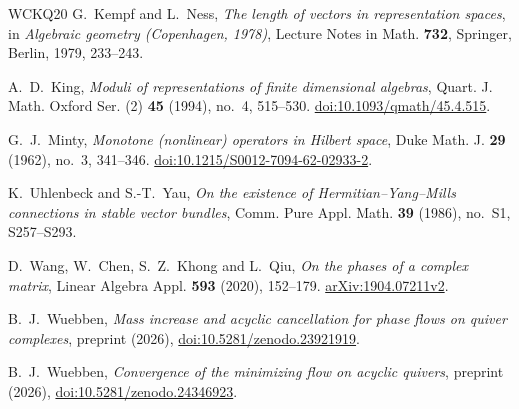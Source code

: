 \begin{thebibliography}{WCKQ20}
G.~Kempf and L.~Ness,
\textit{The length of vectors in representation spaces},
in \textit{Algebraic geometry (Copenhagen, 1978)},
Lecture Notes in Math. \textbf{732}, Springer, Berlin, 1979, 233--243.

A.~D.~King,
\textit{Moduli of representations of finite dimensional algebras},
Quart. J. Math. Oxford Ser. (2) \textbf{45} (1994), no.~4, 515--530.
\href{https://doi.org/10.1093/qmath/45.4.515}{doi:10.1093/qmath/45.4.515}.

G.~J.~Minty,
\textit{Monotone (nonlinear) operators in Hilbert space},
Duke Math. J. \textbf{29} (1962), no.~3, 341--346.
\href{https://doi.org/10.1215/S0012-7094-62-02933-2}{doi:10.1215/S0012-7094-62-02933-2}.

K.~Uhlenbeck and S.-T.~Yau,
\textit{On the existence of Hermitian--Yang--Mills connections in stable
vector bundles},
Comm. Pure Appl. Math. \textbf{39} (1986), no.~S1, S257--S293.

D.~Wang, W.~Chen, S.~Z.~Khong and L.~Qiu,
\textit{On the phases of a complex matrix},
Linear Algebra Appl. \textbf{593} (2020), 152--179.
\href{https://arxiv.org/abs/1904.07211v2}{arXiv:1904.07211v2}.

B.~J.~Wuebben,
\textit{Mass increase and acyclic cancellation for phase flows on quiver
complexes},
preprint (2026),
\href{https://doi.org/10.5281/zenodo.23921919}{doi:10.5281/zenodo.23921919}.

B.~J.~Wuebben,
\textit{Convergence of the minimizing flow on acyclic quivers},
preprint (2026), \href{https://doi.org/10.5281/zenodo.24346923}{doi:10.5281/zenodo.24346923}.

\end{thebibliography}

